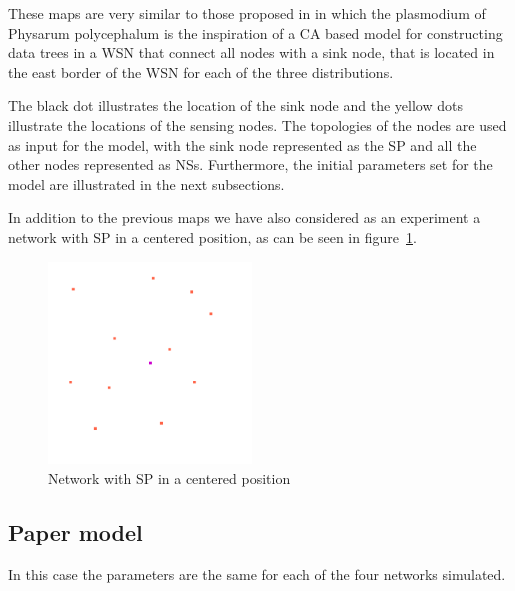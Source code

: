 These maps are very similar to those proposed in \cite{tsompanas2015cellular} in which the plasmodium of Physarum polycephalum is the inspiration of a CA based model for constructing data trees in a WSN that connect all nodes with a sink node, that is located in the east border of the WSN for each of the three distributions.

\par
The black dot illustrates the location of the sink node and the yellow dots illustrate the locations of the sensing nodes. The topologies of the nodes are used as input for the model, with the sink node represented as the SP and all the other nodes represented as NSs. Furthermore, the initial parameters set for the model are illustrated in the next subsections.

\par
In addition to the previous maps we have also considered as an experiment a network with SP in a centered position, as can be seen in figure~\ref{fig:central_sp_exp/1_central_sp}.

\begin{figure}[H]
  \centering
    \includegraphics[width=0.48\textwidth]{central_sp_exp/1_central_sp}%
    
  \caption{Network with SP in a centered position}
  \label{fig:central_sp_exp/1_central_sp}
\end{figure}

\subsection{Paper model}

In this case the parameters are the same for each of the four networks simulated.

